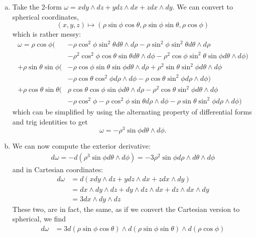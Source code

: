 \documentclass{../../mathnotes}
\begin{document}
\begin{enumerate}[(a)]
    \item Take the 2-form $\omega=x dy\wedge dz+ydz\wedge dx+zdx\wedge dy$. We can convert to spherical coordinates,
        \[(x,y,z)\mapsto(\rho\sin\phi\cos\theta,\rho\sin\phi\sin\theta,\rho\cos\phi)\]
        which is rather messy:
        \begin{align*}
            \omega=\rho\cos\phi(&-\rho\cos^2\phi\sin^2\theta d\theta\wedge d\rho -\rho\sin^2\phi\sin^2\theta d\theta\wedge d\rho \\
            &-\rho^2\cos^2\phi\cos\theta\sin\theta d\theta\wedge d\phi-\rho^2\cos\phi\sin^2\theta\sin\phi d\theta\wedge d\phi)\\
            +\rho\sin\theta\sin\phi(&-\rho\cos\phi\sin\theta\sin\phi d\theta\wedge d\rho+\rho^2\sin\theta\sin^2\phi d\theta\wedge d\phi\\
            &-\rho\cos\theta\cos^2\phi d\rho\wedge d\phi-\rho\cos\theta\sin^2\phi d\rho\wedge d\phi)\\
            +\rho\cos\theta\sin\theta(&\rho\cos\theta\cos\phi\sin\phi d\theta\wedge d\rho-\rho^2\cos\theta\sin^2\phi d\theta\wedge d\phi\\
            &-\rho\cos^2\phi-\rho\cos^2\phi\sin\theta d\rho\wedge d\phi-\rho\sin\theta\sin^2\phi d\rho\wedge d\phi)
        \end{align*}
        which can be simplified by using the alternating property of differential forms and trig identities to get
        \[\omega=-\rho^3 \sin\phi d\theta\wedge d\phi.\]
    \item We can now compute the exterior derivative:
        \begin{align*}
            d\omega=-d(\rho^3\sin\phi d\theta \wedge d\phi)=- 3\rho^2\sin\phi d\rho\wedge d\theta \wedge d\phi
        \end{align*}
        and in Cartesian coordinates:
        \begin{align*}
            d\omega&=d(x dy\wedge dz+ydz\wedge dx+zdx\wedge dy)\\
            &=dx\wedge dy \wedge dz+dy\wedge dz\wedge dx+dz\wedge dx \wedge dy\\
            &=3dx\wedge dy \wedge dz
        \end{align*}
        These two, are in fact, the same, as if we convert the Cartesian version to spherical, we find
        \begin{align*}
            d\omega&=3d(\rho\sin\phi\cos\theta)\wedge d(\rho\sin\phi\sin\theta)\wedge d(\rho\cos\phi)\\

\end{align*}
\end{enumerate}
\end{document}
